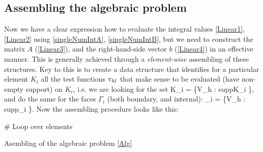 \subsection{Assembling the algebraic problem}
Now we have a clear expression how to evaluate the integral values \ref{Linear1}, \ref{Linear2} using \ref{singleNumIntA}, \ref{singleNumIntB}, but we need to construct the matrix $A$ (\ref{Linear3}), and the right-hand-side vector $b$ (\ref{Linear4}) in an effective manner.
This is generally achieved through a \textit{element-wise} assembling of these structures. Key to this is to create a data structure that identifies for a particular element $K_i$ all the test functions $\mathrm{v}_{hl}$ that make sense to be evaluated (have non-empty support) on $K_i$, i.e. we are looking for the set
\be
\mrvh \lo K_i \ro = \left\{\mrvh \in V_h : supp\lo\mrvh\ro \cap K_i \neq \emptyset \right\},
\ee
and do the same for the faces $\Gamma_i$ (both boundary, and internal):
\be
\mrvh \lo \Gamma_i \ro = \left\{\mrvh \in V_h : supp\lo\mrvh\ro \cap \Gamma_i \neq \emptyset \right\}.
\ee
Now the assembling procedure looks like this:\\
\begin{algorithm}[H]
    \# Loop over elements\\
\caption{Asembling of the algebraic problem \ref{Alg}}
\label{algorithm:singleTimeStep}
\end{algorithm}



